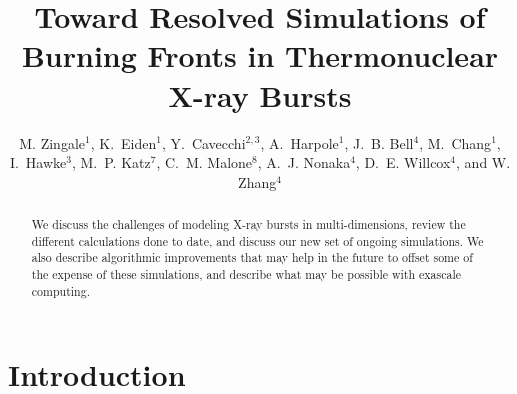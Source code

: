 \documentclass[a4paper]{jpconf}
\begin{document}
\title{Toward Resolved Simulations of Burning Fronts in Thermonuclear
       X-ray Bursts}

\author{M. Zingale$^1$,
        K.~Eiden$^1$,
        Y.~Cavecchi$^{2,3}$,
        A.~Harpole$^1$,
        J.~B. Bell$^4$,
        M.~Chang$^1$,
        I.~Hawke$^3$,
        M.~P. Katz$^7$,
        C.~M. Malone$^8$,
        A.~J. Nonaka$^4$,
        D.~E. Willcox$^4$, and
        W. Zhang$^4$}

\address{$^1$Department of Physics and Astronomy, Stony Brook
  University, Stony Brook, NY 11794-3800 USA}

\address{$^2$Department of Astrophysical Sciences, Princeton University,
  Peyton Hall, Princeton, NJ 08544, USA}

\address{$^3$Mathematical Sciences and STAG Research Centre,
  University of Southampton, SO17 1BJ, UK}

\address{$^4$Center for Computational Sciences and Engineering,
  Lawrence Berkeley National Lab, Berkeley, CA 94720 USA}

\address{$^5$National Energy Research Scientific Computing Center,
  Lawrence Berkeley National Lab, Berkeley, CA 94720 USA}

\address{$^6$Department of Physics and Astronomy, Michigan State
  University, East Lansing, Michigan 48824 USA}

\address{$^7$NVIDIA Corporation, 2788 San Tomas Expressway,
  Santa Clara, CA, 95050 USA}

\address{$^8$Los Alamos National Laboratory, Los Alamos, NM, 87545 USA}

\begin{abstract}
We discuss the challenges of modeling X-ray bursts in
multi-dimensions, review the different calculations done to date, and
discuss our new set of ongoing simulations.  We also describe
algorithmic improvements that may help in the future to offset some of
the expense of these simulations, and describe what may be possible
with exascale computing.
\end{abstract}




\section{Introduction}
\end{document}
